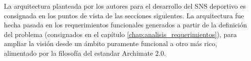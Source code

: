 La arquitectura planteada por los autores para el desarrollo del SNS deportivo es consignada en los puntos de vista de las secciones siguientes. La arquitectura fue hecha pasada en los requerimientos funcionales generados a partir de la definición del problema (consignados en el capítulo \ref{chap:analisis_requerimientos}), para ampliar la visión desde un ámbito puramente funcional a otro más rico, alimentado por la filosofía del estandar Archimate 2.0.

